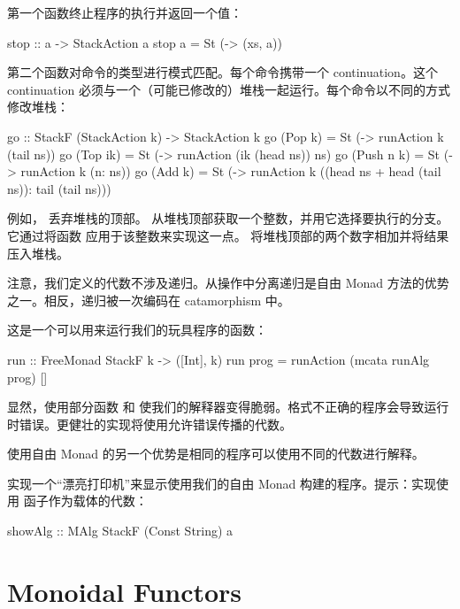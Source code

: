 \documentclass[DaoFP]{subfiles}
\begin{document}
    第一个函数终止程序的执行并返回一个值：

    \begin{haskell}
        stop :: a -> StackAction a
        stop a = St (\xs -> (xs, a))
    \end{haskell}

    第二个函数对命令的类型进行模式匹配。每个命令携带一个 continuation。这个 continuation 必须与一个（可能已修改的）堆栈一起运行。每个命令以不同的方式修改堆栈：

    \begin{haskell}
        go :: StackF (StackAction k) -> StackAction k
        go (Pop k)    = St (\ns -> runAction k (tail ns))
        go (Top ik)   = St (\ns -> runAction (ik (head ns)) ns)
        go (Push n k) = St (\ns -> runAction k (n: ns))
        go (Add k)    = St (\ns -> runAction k
        ((head ns + head (tail ns)): tail (tail ns)))
    \end{haskell}

    例如， 丢弃堆栈的顶部。  从堆栈顶部获取一个整数，并用它选择要执行的分支。它通过将函数  应用于该整数来实现这一点。  将堆栈顶部的两个数字相加并将结果压入堆栈。

    注意，我们定义的代数不涉及递归。从操作中分离递归是自由 Monad 方法的优势之一。相反，递归被一次编码在 catamorphism 中。

    这是一个可以用来运行我们的玩具程序的函数：

    \begin{haskell}
        run :: FreeMonad StackF k -> ([Int], k)
        run prog = runAction (mcata runAlg prog) []
    \end{haskell}

    显然，使用部分函数  和  使我们的解释器变得脆弱。格式不正确的程序会导致运行时错误。更健壮的实现将使用允许错误传播的代数。

    使用自由 Monad 的另一个优势是相同的程序可以使用不同的代数进行解释。

    \begin{exercise}
        实现一个“漂亮打印机”来显示使用我们的自由 Monad 构建的程序。提示：实现使用  函子作为载体的代数：

        \begin{haskell}
            showAlg :: MAlg StackF (Const String) a
        \end{haskell}
    \end{exercise}

\section{Monoidal Functors}
\end{document}
